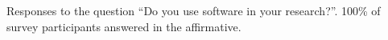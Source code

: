 \label{fig:doyouse}

Responses to the question ``Do you use software in your research?''. 100\% of survey participants answered in the affirmative. 
  
  
  